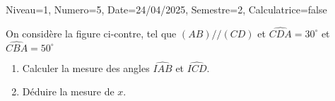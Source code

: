 \documentclass[a4paper,12pt]{article}
\begin{document}
\begin{Maquette}[DS]{Niveau=1, Numero=5, Date=24/04/2025, Semestre=2, Calculatrice=false}
\begin{exercice}[BaremeDetaille]
	On considère la figure ci-contre, tel que $(AB)//(CD)$ et $\widehat{CDA}=30^{\circ}$ et $\widehat{CBA}=50^{\circ}$
\begin{minipage}{.5\linewidth}
\begin{enumerate}
\item{} Calculer la mesure des angles $\widehat{IAB}$ et $\widehat{ICD}$.\newline
\anserline[2]
\item{} Déduire la mesure de $x$.\newline
\anserline[4]
\end{enumerate}
\end{minipage}%
\begin{minipage}{.5\linewidth}
\end{minipage}

\end{exercice}
\end{Maquette}
\end{document}
